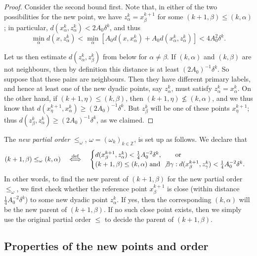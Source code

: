 \documentclass{amsart}
\numberwithin{equation}{section}
\theoremstyle{plain}
\theoremstyle{definition}
\theoremstyle{remark}
\begin{document}
{{\begin{proof}
Consider the second bound first. Note that, in either of the two possibilities for the new point, we have $z^k_{\alpha}=x^{k+1}_{\beta}$ for some $(k+1,\beta)\leq(k,\alpha)$; in particular, $d(x^k_{\alpha},z^k_{\alpha})<2A_0\delta^k$, and thus
\begin{equation*}
  \min_{\alpha}d(x,z^k_{\alpha})<\min_{\alpha}[A_0 d(x,x^k_{\alpha})+A_0 d(x^k_{\alpha},z^k_{\alpha})]<4A_0^2\delta^k.
\end{equation*}

Let us then estimate $d(z^k_{\alpha},z^k_{\beta})$ from below for $\alpha\neq\beta$. If $(k,\alpha)$ and $(k,\beta)$ are not neighbours, then by definition this distance is at least $(2A_0)^{-1}\delta^k$. So suppose that these pairs are neighbours. Then they have different primary labels, and hence at least one of the new dyadic points, say $z^k_{\alpha}$, must satisfy $z^k_{\alpha}=x^k_{\alpha}$. On the other hand, if $(k+1,\eta)\leq(k,\beta)$, then $(k+1,\eta)\not\leq(k,\alpha)$, and we thus know that $d(x^{k+1}_{\eta},x^k_{\alpha})\geq(2A_0)^{-1}\delta^k$. But $z^k_{\beta}$ will be one of these points $x^{k+1}_{\eta}$; thus $d(z^k_{\beta},z^k_{\alpha})\geq(2A_0)^{-1}\delta^k$, as we claimed.
\end{proof}

The \emph{new partial order} $\leq_{\omega}$, $\omega=(\omega_k)_{k\in{\mathbb{Z}}}$, is set up as follows. We declare that
\begin{equation}\label{eq:newLeq}
   (k+1,\beta)\leq_{\omega}(k,\alpha)\quad\overset{\operatorname{def}}{\Longleftrightarrow}\quad
   \begin{cases} d(x^{k+1}_{\beta},z^k_{\alpha})<\tfrac14 A_0^{-2}\delta^k,\qquad \text{or} \\
     (k+1,\beta)\leq(k,\alpha) \text{ and } \not\exists\gamma: d(x^{k+1}_{\beta},z^k_{\gamma})<\tfrac14 A_0^{-2}\delta^k.
   \end{cases}
\end{equation}
In other words, to find the new parent of $(k+1,\beta)$ for the new partial order $\leq_{\omega}$, we first check whether the reference point $x^{k+1}_{\beta}$ is close (within distance $\tfrac14 A_0^{-2}\delta^k$) to some new dyadic point $z^k_{\alpha}$. If yes, then the corresponding $(k,\alpha)$ will be the new parent of $(k+1,\beta)$. If no such close point exists, then we simply use the original partial order $\leq$ to decide the parent of $(k+1,\beta)$.

\subsection*{Properties of the new points and order}

}}
\end{document}
